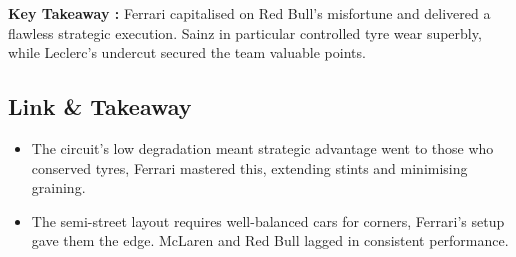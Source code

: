 \textbf{Key Takeaway :}
Ferrari capitalised on Red Bull’s misfortune and delivered a flawless strategic execution. Sainz in particular controlled tyre wear superbly, while Leclerc’s undercut secured the team valuable points.


\subsection{Link \& Takeaway}

\begin{itemize}
    \item The circuit’s low degradation meant strategic advantage went to those who conserved tyres, Ferrari mastered this, extending stints and minimising graining.
    \item The semi-street layout requires well-balanced cars for corners, Ferrari’s setup gave them the edge. McLaren and Red Bull lagged in consistent performance.
\end{itemize}